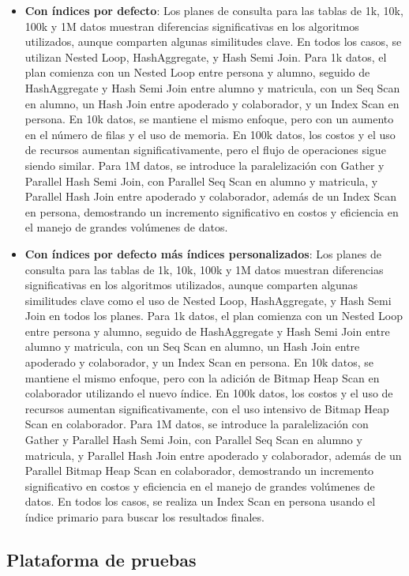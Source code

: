 \begin{itemize}
\begin{itemize}
		      \item {\textbf{Con índices por defecto}: Los planes de consulta para las tablas de 1k, 10k, 100k y 1M datos muestran diferencias significativas en los algoritmos utilizados, aunque comparten algunas similitudes clave. En todos los casos, se utilizan Nested Loop, HashAggregate, y Hash Semi Join. Para 1k datos, el plan comienza con un Nested Loop entre persona y alumno, seguido de HashAggregate y Hash Semi Join entre alumno y matricula, con un Seq Scan en alumno, un Hash Join entre apoderado y colaborador, y un Index Scan en persona. En 10k datos, se mantiene el mismo enfoque, pero con un aumento en el número de filas y el uso de memoria. En 100k datos, los costos y el uso de recursos aumentan significativamente, pero el flujo de operaciones sigue siendo similar. Para 1M datos, se introduce la paralelización con Gather y Parallel Hash Semi Join, con Parallel Seq Scan en alumno y matricula, y Parallel Hash Join entre apoderado y colaborador, además de un Index Scan en persona, demostrando un incremento significativo en costos y eficiencia en el manejo de grandes volúmenes de datos.}
		      \item {\textbf{Con índices por defecto más índices personalizados}: Los planes de consulta para las tablas de 1k, 10k, 100k y 1M datos muestran diferencias significativas en los algoritmos utilizados, aunque comparten algunas similitudes clave como el uso de Nested Loop, HashAggregate, y Hash Semi Join en todos los planes. Para 1k datos, el plan comienza con un Nested Loop entre persona y alumno, seguido de HashAggregate y Hash Semi Join entre alumno y matricula, con un Seq Scan en alumno, un Hash Join entre apoderado y colaborador, y un Index Scan en persona. En 10k datos, se mantiene el mismo enfoque, pero con la adición de Bitmap Heap Scan en colaborador utilizando el nuevo índice. En 100k datos, los costos y el uso de recursos aumentan significativamente, con el uso intensivo de Bitmap Heap Scan en colaborador. Para 1M datos, se introduce la paralelización con Gather y Parallel Hash Semi Join, con Parallel Seq Scan en alumno y matricula, y Parallel Hash Join entre apoderado y colaborador, además de un Parallel Bitmap Heap Scan en colaborador, demostrando un incremento significativo en costos y eficiencia en el manejo de grandes volúmenes de datos. En todos los casos, se realiza un Index Scan en persona usando el índice primario para buscar los resultados finales.}
	      \end{itemize}
\end{itemize}
\subsection{Plataforma de pruebas}


